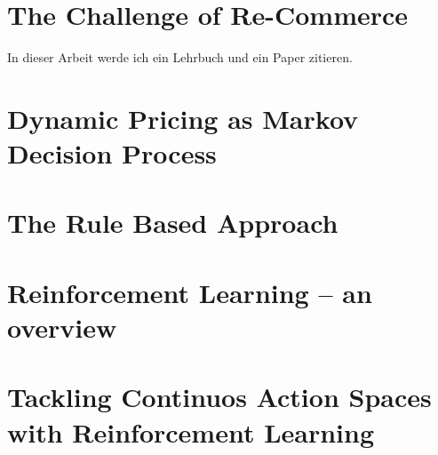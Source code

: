 \section{The Challenge of Re-Commerce}
In dieser Arbeit werde ich ein Lehrbuch \cite{Sutton1998} und ein Paper \cite{DBLP:journals/corr/abs-1712-01815} zitieren.

\section{Dynamic Pricing as Markov Decision Process}

\section{The Rule Based Approach}

\section{Reinforcement Learning -- an overview}

\section{Tackling Continuos Action Spaces with Reinforcement Learning}
